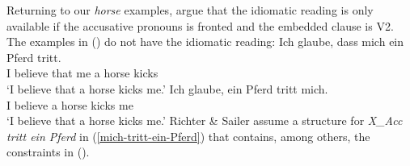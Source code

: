 Returning to our \emph{horse} examples, \citet[]{RS2009a} argue that the idiomatic reading
is only available if the accusative pronouns is fronted and the embedded clause is V2. The examples
in () do not have the idiomatic reading:
\eal
\ex 
\gll Ich glaube, dass mich ein Pferd tritt.\\
     I believe   that me   a horse   kicks\\
\glt `I believe that a horse kicks me.'
\ex 
\gll Ich glaube, ein Pferd tritt mich.\\
     I believe   a horse   kicks me\\
\glt `I believe that a horse kicks me.'
\zl
Richter \& Sailer assume a structure for \emph{X\_Acc tritt ein Pferd} in (\ref{mich-tritt-ein-Pferd}) that contains, among others,
the constraints in ().

